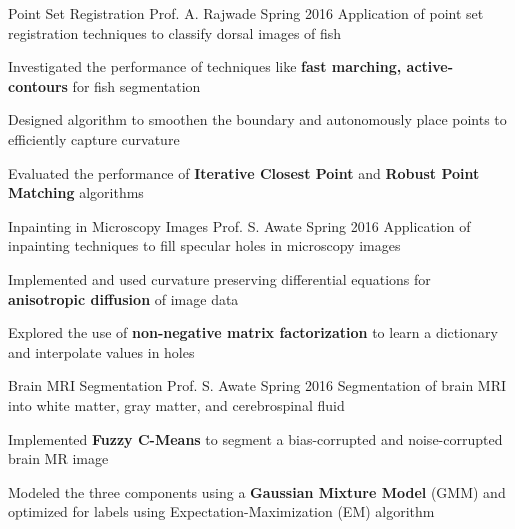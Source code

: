 \begin{cventries}
%
\acadprojectentry
{Point Set Registration} %
{Prof. A. Rajwade} %
{Spring 2016} %
{Application of point set registration techniques to classify dorsal images of fish} %
{ %
\begin{cvitems}
\item {Investigated the performance of techniques like \textbf{fast marching, active-contours} for fish segmentation}
\item {Designed algorithm to smoothen the boundary and autonomously place points to efficiently capture curvature}
\item {Evaluated the performance of \textbf{Iterative Closest Point} and \textbf{Robust Point Matching} algorithms}
\end{cvitems}
}
%
\acadprojectentry
{Inpainting in Microscopy Images} %
{Prof. S. Awate} %
{Spring 2016} %
{Application of inpainting techniques to fill specular holes in microscopy images} %
{ %
\begin{cvitems}
    \item {Implemented and used curvature preserving differential equations for \textbf{anisotropic diffusion} of image data}
    \item {Explored the use of \textbf{non-negative matrix factorization} to learn a dictionary and interpolate values in holes}
\end{cvitems}
}
\acadprojectentry
{Brain MRI Segmentation} %
{Prof. S. Awate} %
{Spring 2016} %
{Segmentation of brain MRI into white matter, gray matter, and cerebrospinal fluid}
{
    \begin{cvitems}
        \item{Implemented \textbf{Fuzzy C-Means} to segment a bias-corrupted and noise-corrupted brain MR image}
        \item{Modeled the three components using a \textbf{Gaussian Mixture Model} (GMM) and optimized for labels using Expectation-Maximization (EM) algorithm}

\end{cvitems}}
\end{cventries}
